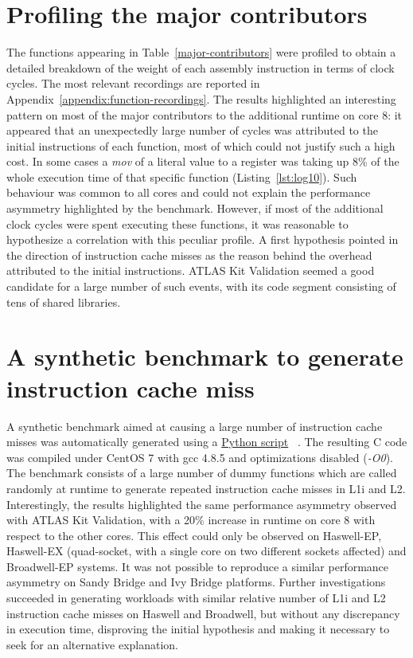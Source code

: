 \documentclass[a4paper]{jpconf}
\begin{document}
\section{Profiling the major contributors}
The functions appearing in Table~\ref{major-contributors} were profiled to obtain
a detailed breakdown of the weight of each assembly instruction in terms of
clock cycles. The most relevant recordings are reported in Appendix~\ref{appendix:function-recordings}. 
The results highlighted an interesting pattern on most of the major contributors to 
the additional runtime on core 8:  it appeared that an unexpectedly
large number of cycles was attributed to the initial instructions of each function,
most of which could not justify such a high cost. In some cases a
\textit{mov} of a literal value to a register was taking up 8\% of the whole
execution time of that specific function (Listing~\ref{lst:log10}).
Such behaviour was common to all cores and could not explain the performance
asymmetry highlighted by the benchmark. However, if most of the additional
clock cycles were spent executing these functions, it was reasonable to hypothesize
a correlation with this peculiar profile. A first hypothesis
pointed in the direction of instruction cache misses as the reason behind
the overhead attributed to the initial instructions.
ATLAS Kit Validation seemed a good candidate for a large number of such events,
with its code segment consisting of tens of shared libraries.

\section{A synthetic benchmark to generate instruction cache miss}
A synthetic benchmark aimed at causing a large number of instruction cache
misses was automatically generated using a \href{https://gitlab.cern.ch/snippets/216}{Python script} ~\cite{synthetic_benchmark:icache_misses}.
The resulting C code was compiled
under CentOS 7 with gcc 4.8.5 and optimizations disabled (\textit{-O0}). The benchmark 
consists of a large number of dummy functions which are called randomly at runtime to generate
repeated instruction cache misses in L1i and L2. Interestingly, the results
highlighted the same performance asymmetry observed with ATLAS Kit Validation,
with a 20\% increase in runtime on core 8 with respect to the other cores.
This effect could only be observed on Haswell-EP, Haswell-EX (quad-socket, with
a single core on two different sockets affected) and Broadwell-EP systems. It
was not possible to reproduce a similar performance asymmetry on Sandy Bridge
and Ivy Bridge platforms.
Further investigations succeeded in generating
workloads with similar relative number of L1i and L2 instruction cache misses
on Haswell and Broadwell, but without any discrepancy in execution time,
disproving the initial hypothesis and making it necessary to seek for an
alternative explanation.
\end{document}

